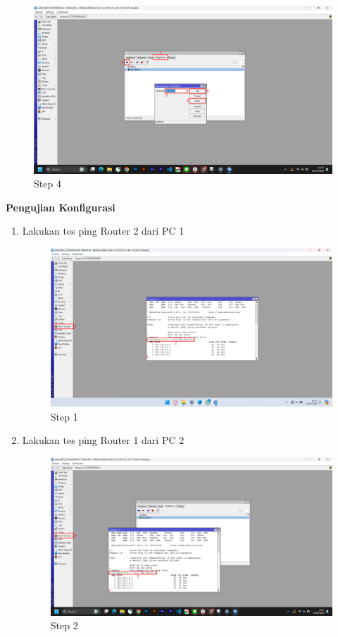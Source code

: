 \begin{center}
\begin{enumerate}
\begin{figure}[H]
			\centering
			\includegraphics[width=0.9\linewidth]{P2/img/per2/pc2/Step 5.png}
			\caption{Step 4}
			\label{fig:Step 4(Per.2 PC2)}
		\end{figure}
	\end{enumerate}

	\textbf{Pengujian Konfigurasi}
	\begin{enumerate}
		\item Lakukan tes ping Router 2 dari PC 1
		\begin{figure}[H]
			\centering
			\includegraphics[width=0.9\linewidth]{P2/img/per2/pc1/Step 6.png}
			\caption{Step 1}
			\label{fig:Ping Step 1(Per.2 PC1)}
		\end{figure}
		\item Lakukan tes ping Router 1 dari PC 2
		\begin{figure}[H]
			\centering
			\includegraphics[width=0.9\linewidth]{P2/img/per2/pc2/Step 6.png}
			\caption{Step 2}
			\label{fig:Ping Step 2(Per.2 PC2)}
		\end{figure}
	\end{enumerate}
\end{center}

